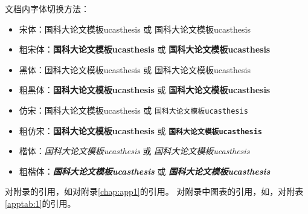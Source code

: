 文档内字体切换方法：
    \begin{itemize}
        \item 宋体：国科大论文模板ucasthesis 或 \textrm{国科大论文模板ucasthesis}
        \item 粗宋体：{\bfseries 国科大论文模板ucasthesis} 或 \textbf{国科大论文模板ucasthesis}
        \item 黑体：{\sffamily 国科大论文模板ucasthesis} 或 \textsf{国科大论文模板ucasthesis}
        \item 粗黑体：{\bfseries\sffamily 国科大论文模板ucasthesis} 或 \textsf{\bfseries 国科大论文模板ucasthesis}
        \item 仿宋：{\ttfamily 国科大论文模板ucasthesis} 或 \texttt{国科大论文模板ucasthesis}
        \item 粗仿宋：{\bfseries\ttfamily 国科大论文模板ucasthesis} 或 \texttt{\bfseries 国科大论文模板ucasthesis}
        \item 楷体：{\itshape 国科大论文模板ucasthesis} 或 \textit{国科大论文模板ucasthesis}
        \item 粗楷体：{\bfseries\itshape 国科大论文模板ucasthesis} 或 \textit{\bfseries 国科大论文模板ucasthesis}
    \end{itemize}
    
对附录的引用，如对附录\ref{chap:app1}的引用。
对附录中图表的引用，如，对附表\ref{apptab:1}的引用。
